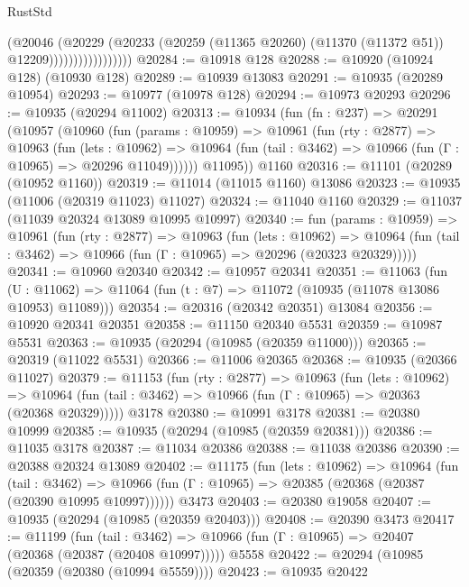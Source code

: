 \begin{lexlean}{RustStd}
\begin{coremodule}
{{{{{{{{{{{{{{{{{{{                              (@20046
                                (@20229
                                  (@20233
                                    (@20259
                                      (@11365 @20260)
                                      (@11370 (@11372 @51))
                                      @12209)))))))))))))))))
@20284 := @10918 @128
@20288 := @10920 (@10924 @128) (@10930 @128)
@20289 := @10939 @13083
@20291 := @10935 (@20289 @10954)
@20293 := @10977 (@10978 @128)
@20294 := @10973 @20293
@20296 := @10935 (@20294 @11002)
@20313 := @10934
    (fun (fn : @237) =>
    @20291
      (@10957
        (@10960
          (fun (params : @10959) =>
          @10961
            (fun (rty : @2877) =>
            @10963
              (fun (lets : @10962) =>
              @10964 (fun (tail : @3462) => @10966 (fun (Γ : @10965) => @20296 @11049))))))
        @11095))
    @1160
@20316 := @11101 (@20289 (@10952 @1160))
@20319 := @11014 (@11015 @1160) @13086
@20323 := @10935 (@11006 (@20319 @11023) @11027)
@20324 := @11040 @1160
@20329 := @11037 (@11039 @20324 @13089 @10995 @10997)
@20340 := fun (params : @10959) =>
  @10961
    (fun (rty : @2877) =>
    @10963
      (fun (lets : @10962) =>
      @10964 (fun (tail : @3462) => @10966 (fun (Γ : @10965) => @20296 (@20323 @20329)))))
@20341 := @10960 @20340
@20342 := @10957 @20341
@20351 := @11063
    (fun (U : @11062) => @11064 (fun (t : @7) => @11072 (@10935 (@11078 @13086 @10953) @11089)))
@20354 := @20316 (@20342 @20351) @13084
@20356 := @10920 @20341 @20351
@20358 := @11150 @20340 @5531
@20359 := @10987 @5531
@20363 := @10935 (@20294 (@10985 (@20359 @11000)))
@20365 := @20319 (@11022 @5531)
@20366 := @11006 @20365
@20368 := @10935 (@20366 @11027)
@20379 := @11153
    (fun (rty : @2877) =>
    @10963
      (fun (lets : @10962) =>
      @10964 (fun (tail : @3462) => @10966 (fun (Γ : @10965) => @20363 (@20368 @20329)))))
    @3178
@20380 := @10991 @3178
@20381 := @20380 @10999
@20385 := @10935 (@20294 (@10985 (@20359 @20381)))
@20386 := @11035 @3178
@20387 := @11034 @20386
@20388 := @11038 @20386
@20390 := @20388 @20324 @13089
@20402 := @11175
    (fun (lets : @10962) =>
    @10964
      (fun (tail : @3462) =>
      @10966 (fun (Γ : @10965) => @20385 (@20368 (@20387 (@20390 @10995 @10997))))))
    @3473
@20403 := @20380 @19058
@20407 := @10935 (@20294 (@10985 (@20359 @20403)))
@20408 := @20390 @3473
@20417 := @11199
    (fun (tail : @3462) => @10966 (fun (Γ : @10965) => @20407 (@20368 (@20387 (@20408 @10997)))))
    @5558
@20422 := @20294 (@10985 (@20359 (@20380 (@10994 @5559))))
@20423 := @10935 @20422
}}}}}}}}}}}}}}}}}}}
\end{coremodule}
\end{lexlean}
